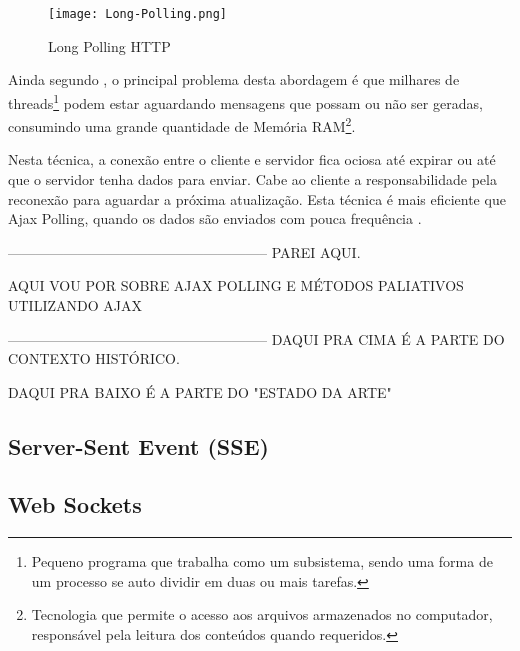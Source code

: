 \begin{figure}[!htb]
	\centering
	\texttt{[image: Long-Polling.png]}
	\caption{Long Polling HTTP}
	\label{fig:longPolling}
\end{figure}

Ainda segundo , o principal problema desta abordagem é que milhares de threads\footnote{Pequeno programa que trabalha como um subsistema, sendo uma forma de um processo se auto dividir em duas ou mais tarefas.} podem estar aguardando mensagens que possam ou não ser geradas, consumindo uma grande quantidade de Memória RAM\footnote{Tecnologia que permite o acesso aos arquivos armazenados no computador, responsável pela leitura dos conteúdos quando requeridos.}.

Nesta técnica, a conexão entre o cliente e servidor fica ociosa até expirar ou até que o servidor tenha dados para enviar. Cabe ao cliente a responsabilidade pela reconexão para aguardar a próxima atualização. Esta técnica é mais eficiente que Ajax Polling, quando os dados são enviados com pouca frequência \cite{gutwin2011real}.

--------------------------------------------------------
PAREI AQUI.

AQUI VOU POR SOBRE AJAX POLLING E MÉTODOS PALIATIVOS UTILIZANDO AJAX


--------------------------------------------------------
DAQUI PRA CIMA É A PARTE DO CONTEXTO HISTÓRICO.

DAQUI PRA BAIXO É A PARTE DO "ESTADO DA ARTE"

\subsection{Server-Sent Event (SSE)}

\subsection{Web Sockets}

